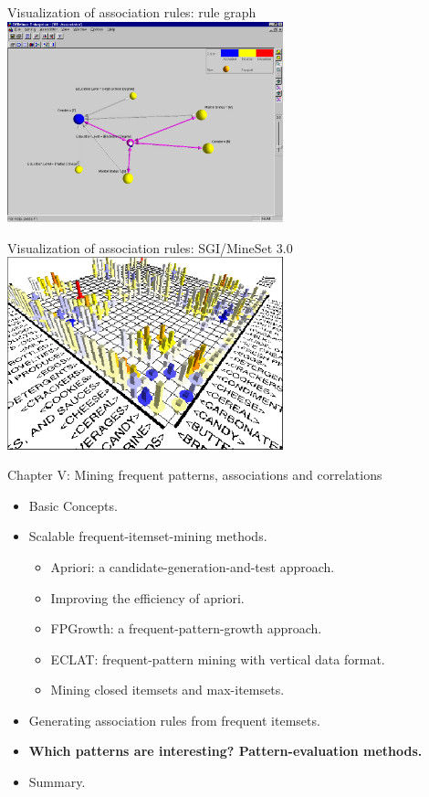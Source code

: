 \documentclass[aspectratio=169,t,xcolor=dvipsnames]{beamer}
\begin{document}
  {
    \begin{frame}{Visualization of association rules: rule graph}
    \includegraphics[width=0.6\textwidth]{img/assoc_rules2.jpg}
    \end{frame}
  }

  {
    \begin{frame}{Visualization of association rules: SGI/MineSet 3.0}
    \includegraphics[width=0.6\textwidth]{img/assoc_rules3.png}
    \end{frame}
  }

  {
    \begin{frame}{Chapter V: Mining frequent patterns, associations and correlations}
        \begin{itemize}
            \item Basic Concepts.
            \item Scalable frequent-itemset-mining methods.
            \begin{itemize}
              \item Apriori: a candidate-generation-and-test approach.
              \item Improving the efficiency of apriori.
              \item FPGrowth:  a frequent-pattern-growth approach.
              \item ECLAT: frequent-pattern mining with vertical data format.
              \item Mining closed itemsets and max-itemsets.
            \end{itemize}
            \item Generating association rules from frequent itemsets.
            \item \textbf{Which patterns are interesting? Pattern-evaluation methods.}
            \item Summary.
        \end{itemize}
    \end{frame}
  }
\end{document}
